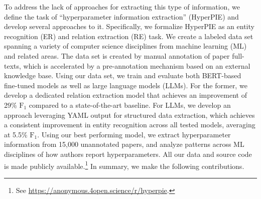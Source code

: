 

To address the lack of approaches for extracting this type of information, we define the task of ``hyperparameter information extraction'' (HyperPIE) and develop several approaches to it. Specifically, we formalize HyperPIE as an entity recognition (ER) and relation extraction (RE) task. We create a labeled data set spanning a variety of computer science disciplines from machine learning (ML) and related areas. The data set is created by manual annotation of paper full-texts, which is accelerated by a pre-annotation mechanism based on an external knowledge base. Using our data set, we train and evaluate both BERT-based~\cite{devlin2019} fine-tuned models as well as large language models (LLMs).
For the former, we develop a dedicated relation extraction model that achieves an improvement of 29\% $\text{F}_1$ compared to a state-of-the-art baseline.
For LLMs, we develop an approach leveraging YAML output for structured data extraction, which achieves a consistent improvement in entity recognition across all tested models, averaging at 5.5\% $\text{F}_1$.
Using our best performing model, we extract hyperparameter information from 
15,000 unannotated papers, and analyze patterns across ML disciplines of how authors report hyperparameters.
All our data and source code is made publicly available.\footnote{See \url{https://anonymous.4open.science/r/hyperpie}.}
%
%
In summary, we make the following contributions.

